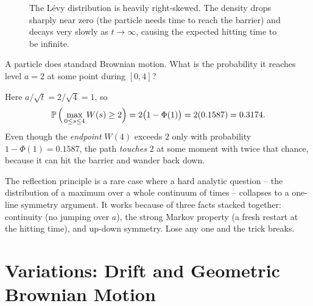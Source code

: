 \begin{figure}[H]
\caption{The L\'evy distribution is heavily right-skewed. The density drops sharply near zero
(the particle needs time to reach the barrier) and decays very slowly as $t \to \infty$,
causing the expected hitting time to be infinite.}
\label{ch29:fig-levy}
\end{figure}

\begin{example}
\label{ch29:ex-barrier}
A particle does standard Brownian motion. What is the probability it reaches level
$a=2$ at some point during $[0,4]$?

Here $a/\sqrt t = 2/\sqrt4 = 1$, so
\[
  \P\Big(\max_{0\le s\le4}W(s)\ge 2\Big) = 2\big(1-\Phi(1)\big)
  = 2(0.1587) = 0.3174.
\]
Even though the \emph{endpoint} $W(4)$ exceeds $2$ only with probability
$1-\Phi(1)=0.1587$, the path \emph{touches} $2$ at some moment with twice that
chance, because it can hit the barrier and wander back down.
\end{example}

\begin{aestheticbox}
The reflection principle is a rare case where a hard analytic question -- the
distribution of a maximum over a whole continuum of times -- collapses to a
one-line symmetry argument. It works because of three facts stacked together:
continuity (no jumping over $a$), the strong Markov property (a fresh restart at
the hitting time), and up-down symmetry. Lose any one and the trick breaks.
\end{aestheticbox}

\section{Variations: Drift and Geometric Brownian Motion}
\label{ch29:drift}

